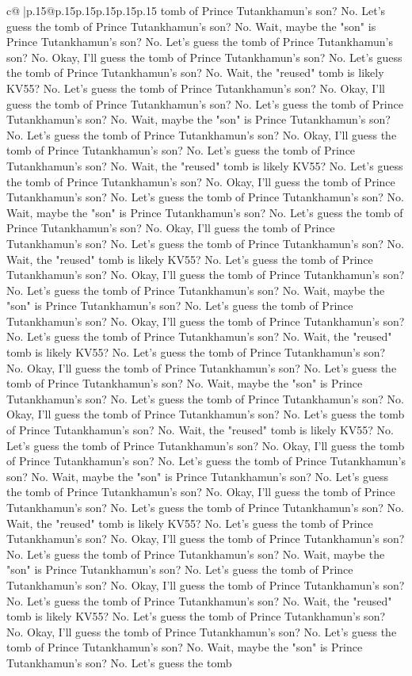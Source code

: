 \documentclass{article}
\begin{document}
{\begin{supertabular}{c@{$\;$}|p{.15\linewidth}@{}p{.15\linewidth}p{.15\linewidth}p{.15\linewidth}p{.15\linewidth}p{.15\linewidth}}
{{{tomb of Prince Tutankhamun's son? No. Let's guess the tomb of Prince Tutankhamun's son? No. Wait, maybe the "son" is Prince Tutankhamun's son? No. Let's guess the tomb of Prince Tutankhamun's son? No. Okay, I'll guess the tomb of Prince Tutankhamun's son? No. Let's guess the tomb of Prince Tutankhamun's son? No. Wait, the "reused" tomb is likely KV55? No. Let's guess the tomb of Prince Tutankhamun's son? No. Okay, I'll guess the tomb of Prince Tutankhamun's son? No. Let's guess the tomb of Prince Tutankhamun's son? No. Wait, maybe the "son" is Prince Tutankhamun's son? No. Let's guess the tomb of Prince Tutankhamun's son? No. Okay, I'll guess the tomb of Prince Tutankhamun's son? No. Let's guess the tomb of Prince Tutankhamun's son? No. Wait, the "reused" tomb is likely KV55? No. Let's guess the tomb of Prince Tutankhamun's son? No. Okay, I'll guess the tomb of Prince Tutankhamun's son? No. Let's guess the tomb of Prince Tutankhamun's son? No. Wait, maybe the "son" is Prince Tutankhamun's son? No. Let's guess the tomb of Prince Tutankhamun's son? No. Okay, I'll guess the tomb of Prince Tutankhamun's son? No. Let's guess the tomb of Prince Tutankhamun's son? No. Wait, the "reused" tomb is likely KV55? No. Let's guess the tomb of Prince Tutankhamun's son? No. Okay, I'll guess the tomb of Prince Tutankhamun's son? No. Let's guess the tomb of Prince Tutankhamun's son? No. Wait, maybe the "son" is Prince Tutankhamun's son? No. Let's guess the tomb of Prince Tutankhamun's son? No. Okay, I'll guess the tomb of Prince Tutankhamun's son? No. Let's guess the tomb of Prince Tutankhamun's son? No. Wait, the "reused" tomb is likely KV55? No. Let's guess the tomb of Prince Tutankhamun's son? No. Okay, I'll guess the tomb of Prince Tutankhamun's son? No. Let's guess the tomb of Prince Tutankhamun's son? No. Wait, maybe the "son" is Prince Tutankhamun's son? No. Let's guess the tomb of Prince Tutankhamun's son? No. Okay, I'll guess the tomb of Prince Tutankhamun's son? No. Let's guess the tomb of Prince Tutankhamun's son? No. Wait, the "reused" tomb is likely KV55? No. Let's guess the tomb of Prince Tutankhamun's son? No. Okay, I'll guess the tomb of Prince Tutankhamun's son? No. Let's guess the tomb of Prince Tutankhamun's son? No. Wait, maybe the "son" is Prince Tutankhamun's son? No. Let's guess the tomb of Prince Tutankhamun's son? No. Okay, I'll guess the tomb of Prince Tutankhamun's son? No. Let's guess the tomb of Prince Tutankhamun's son? No. Wait, the "reused" tomb is likely KV55? No. Let's guess the tomb of Prince Tutankhamun's son? No. Okay, I'll guess the tomb of Prince Tutankhamun's son? No. Let's guess the tomb of Prince Tutankhamun's son? No. Wait, maybe the "son" is Prince Tutankhamun's son? No. Let's guess the tomb of Prince Tutankhamun's son? No. Okay, I'll guess the tomb of Prince Tutankhamun's son? No. Let's guess the tomb of Prince Tutankhamun's son? No. Wait, the "reused" tomb is likely KV55? No. Let's guess the tomb of Prince Tutankhamun's son? No. Okay, I'll guess the tomb of Prince Tutankhamun's son? No. Let's guess the tomb of Prince Tutankhamun's son? No. Wait, maybe the "son" is Prince Tutankhamun's son? No. Let's guess the tomb }}}
\end{supertabular}}
\end{document}
